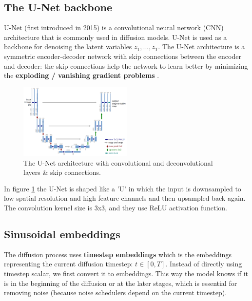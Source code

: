 \subsection{The U-Net backbone}
\label{subsec:stable_diffusion_u_net_backbone}

U-Net (first introduced in 2015) \cite{unet} is a convolutional neural network (CNN) architecture that is commonly used in diffusion models. U-Net is used as a backbone for denoising the latent variables $z_1, ..., z_T$. The U-Net architecture is a symmetric encoder-decoder network with skip connections between the encoder and decoder: the skip connections help the network to learn better by minimizing the \textbf{exploding / vanishing gradient problems} \cite{exploding_vanishing_gradients}.

\begin{figure}
    \centering
    \includegraphics[width=0.5\textwidth]{images/diffusion_models/stable_diffusion/u-net-architecture.png}
    \caption{The U-Net architecture \cite{unet} with convolutional and deconvolutional layers \& skip connections.}
    \label{fig:unet_architecture}
\end{figure}

In figure \ref{fig:unet_architecture} the U-Net is shaped like a 'U' in which the input is downsampled to low spatial resolution and high feature channels and then upsampled back again. The convolution kernel size is 3x3, and they use ReLU activation function.








\subsection{Sinusoidal embeddings}
\label{subsec:sinusoidal_embeddings}

The diffusion process uses \textbf{timestep embeddings} which is the embeddings representing the current diffusion timestep: $t \in [0, T]$. Instead of directly using timestep scalar, we first convert it to embeddings. This way the model knows if it is in the beginning of the diffusion or at the later stages, which is essential for removing noise (because noise schedulers depend on the current timestep).

